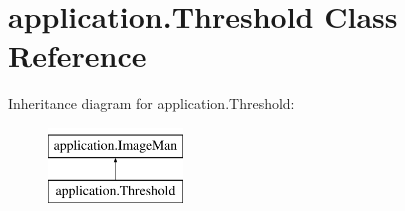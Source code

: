 \hypertarget{classapplication_1_1_threshold}{}\section{application.\+Threshold Class Reference}
\label{classapplication_1_1_threshold}
Inheritance diagram for application.\+Threshold\+:\begin{figure}[H]
\begin{center}
\leavevmode
\includegraphics[height=2.000000cm]{classapplication_1_1_threshold}
\end{center}
\end{figure}
